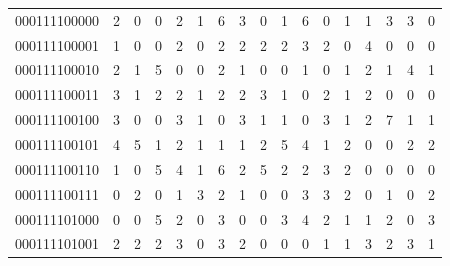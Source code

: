 \documentclass[10pt,a4paper]{article}
\begin{document}
\begin{longtable}{ |c|c|c|c|c|c|c|c|c|c|c|c|c|c|c|c|c| }
    000111100000              & 2                            & 0                                & 0                            & 2                              & 1   & 6   & 3   & 0   & 1   & 6   & 0   & 1   & 1   & 3   & 3   & 0   \\
    000111100001              & 1                            & 0                                & 0                            & 2                              & 0   & 2   & 2   & 2   & 2   & 3   & 2   & 0   & 4   & 0   & 0   & 0   \\
    000111100010              & 2                            & 1                                & 5                            & 0                              & 0   & 2   & 1   & 0   & 0   & 1   & 0   & 1   & 2   & 1   & 4   & 1   \\
    000111100011              & 3                            & 1                                & 2                            & 2                              & 1   & 2   & 2   & 3   & 1   & 0   & 2   & 1   & 2   & 0   & 0   & 0   \\
    000111100100              & 3                            & 0                                & 0                            & 3                              & 1   & 0   & 3   & 1   & 1   & 0   & 3   & 1   & 2   & 7   & 1   & 1   \\
    000111100101              & 4                            & 5                                & 1                            & 2                              & 1   & 1   & 1   & 2   & 5   & 4   & 1   & 2   & 0   & 0   & 2   & 2   \\
    000111100110              & 1                            & 0                                & 5                            & 4                              & 1   & 6   & 2   & 5   & 2   & 2   & 3   & 2   & 0   & 0   & 0   & 0   \\
    000111100111              & 0                            & 2                                & 0                            & 1                              & 3   & 2   & 1   & 0   & 0   & 3   & 3   & 2   & 0   & 1   & 0   & 2   \\
    000111101000              & 0                            & 0                                & 5                            & 2                              & 0   & 3   & 0   & 0   & 3   & 4   & 2   & 1   & 1   & 2   & 0   & 3   \\
    000111101001              & 2                            & 2                                & 2                            & 3                              & 0   & 3   & 2   & 0   & 0   & 0   & 1   & 1   & 3   & 2   & 3   & 1   \\

\end{longtable}
\end{document}
